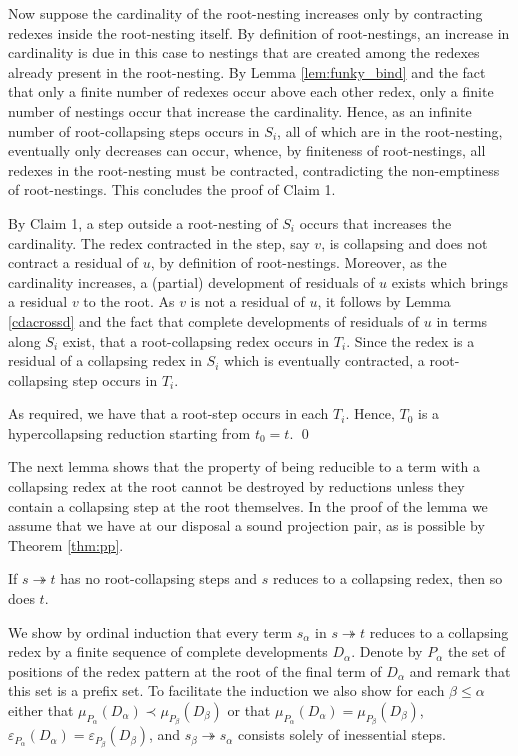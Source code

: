 \documentclass{LMCS}
\theoremstyle{plain}
\theoremstyle{definition}
\newcommand{\trewt}{\twoheadrightarrow}
\newcommand{\pmap}{\varepsilon}
\newcommand{\pmapp}[2]{\pmap_{#1}({#2})}
\newcommand{\pme}{\mu}
\newcommand{\pmep}[2]{\pme_{#1}({#2})}
\begin{document}
\begin{enumerate}[(1)]
Now suppose the cardinality of the root-nesting increases only by contracting redexes inside the root-nesting itself. By definition of root-nestings, an increase in cardinality is due in this case to nestings that are created among the redexes already present in the root-nesting. By Lemma \ref{lem:funky_bind} and the fact that only a finite number of redexes occur above each other redex, only a finite number of nestings occur that increase the cardinality. Hence, as an infinite number of root-collapsing steps occurs in $S_i$, all of which are in the root-nesting, eventually only decreases can occur, whence, by finiteness of root-nestings, all redexes in the root-nesting must be contracted, contradicting the non-emptiness of root-nestings. This concludes the proof of Claim 1.

By Claim 1, a step outside a root-nesting of $S_i$ occurs that increases the cardinality. The redex contracted in the step, say $v$, is collapsing and does not contract a residual of $u$, by definition of root-nestings. Moreover, as the cardinality increases, a (partial) development of residuals of $u$ exists which brings a residual $v$ to the root. As $v$ is not a residual of $u$, it follows by Lemma \ref{cdacrossd} and the fact that complete developments of residuals of $u$ in terms along $S_i$ exist, that a root-collapsing redex occurs in $T_i$. Since the redex is a residual of a collapsing redex in $S_i$ which is eventually contracted, a root-collapsing step occurs in $T_i$.
\end{enumerate}

As required, we have that a root-step occurs in each $T_i$. Hence, $T_0$ is a hypercollapsing reduction starting from $t_0 = t$. \qed

The next lemma shows that the property of being reducible to a term
with a collapsing redex at the root cannot be destroyed by reductions
unless they contain a collapsing step at the root themselves. In the
proof of the lemma we assume that we have at our disposal a sound projection pair,
as is possible by Theorem \ref{thm:pp}.

\begin{lem}
\label{lem:root_collapses_preserved}
If $s \trewt t$ has no root-collapsing steps and $s$ reduces to a collapsing redex, then so does $t$.
\end{lem}

\proof
We show by ordinal induction that every term $s_\alpha$ in $s \trewt t$ reduces to a collapsing redex by a finite sequence of complete developments $D_\alpha$. Denote by $P_\alpha$ the set of positions of the redex pattern at the root of the final term of $D_\alpha$ and remark that this set is a prefix set. To facilitate the induction we also show for each $\beta \leq \alpha$ either that $\pmep{P_\alpha}{D_\alpha} \prec \pmep{P_\beta}{D_\beta}$ or that $\pmep{P_\alpha}{D_\alpha} = \pmep{P_\beta}{D_\beta}$, $\pmapp{P_\alpha}{D_\alpha} = \pmapp{P_\beta}{D_\beta}$, and $s_\beta \trewt s_\alpha$ consists solely of inessential steps.
\end{document}
